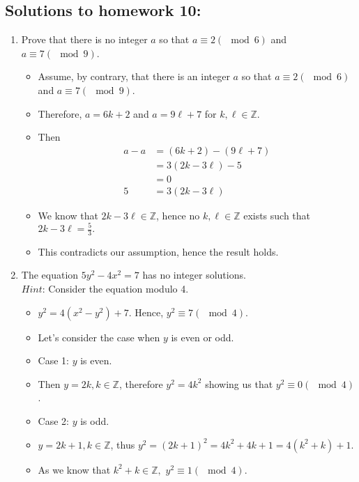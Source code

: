 \documentclass[letterpaper,12pt]{article}
\begin{document}
\subsection*{Solutions to homework 10:}

\begin{enumerate}
\item Prove that there is no integer $a$ so that $a \equiv 2(\mod 6)$ and $a \equiv 7(\mod 9)$.
\begin{itemize}
	\item Assume, by contrary, that there is an integer $a$ so that $a \equiv 2(\mod 6)$ and $a \equiv 7(\mod 9)$.
	\item Therefore, $a=6k+2$ and $a=9\ell +7$ for $k,\ell \in \mathbb{Z}$.
	\item Then
	\begin{align}
	a-a &= (6k+2)-(9\ell+7) \\ &=3(2k-3\ell)-5 \\&=0 \\ 5&=3(2k-3\ell)	
	\end{align}
	\item We know that $2k-3\ell \in \mathbb{Z}$, hence no $k,\ell \in \mathbb{Z}$ exists such that $2k-3\ell = \frac{5}{3}.$
	\item This contradicts our assumption, hence the result holds.
\end{itemize}
\item The equation $5y^2-4x^2= 7$ has no integer solutions. \\ $Hint$: Consider the equation modulo 4.
\begin{itemize}
	\item $y^2 = 4(x^2-y^2)+7$. Hence, $y^2 \equiv 7(\mod 4).$
	\item Let's consider the case when $y$ is even or odd.
	\item Case 1: $y$ is even.
	\item Then $y =2k,k\in \mathbb{Z}$, therefore $y^2 = 4k^2$ showing us that $y^2\equiv 0 (\mod 4)$.
	\item Case 2: $y$ is odd.
	\item $y=2k+1,k \in \mathbb{Z}$, thus $y^2=(2k+1)^2=4k^2+4k+1 = 4(k^2+k)+1$.
	\item As we know that $k^2+k \in \mathbb{Z},$ $y^2 \equiv 1(\mod 4)$.

\end{itemize}
\end{enumerate}
\end{document}
